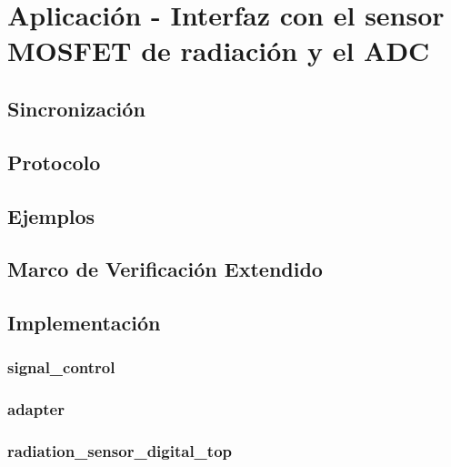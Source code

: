 \documentclass[a4paper, twoside, 11pt]{report}
\begin{document}
\FloatBarrier
\section{Aplicación - Interfaz con el sensor MOSFET de radiación y el ADC}

\FloatBarrier
\subsection{Sincronización}

\FloatBarrier
\subsection{Protocolo}

\FloatBarrier
\subsection{Ejemplos}

\FloatBarrier
\subsection{Marco de Verificación Extendido}

\FloatBarrier
\subsection{Implementación}

\FloatBarrier
\subsubsection{signal\_control}

\FloatBarrier
\subsubsection{adapter}

\FloatBarrier
\subsubsection{radiation\_sensor\_digital\_top}

\end{document}
